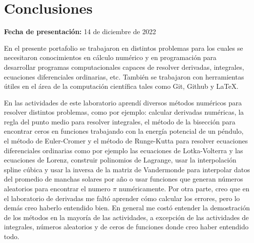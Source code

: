 \documentclass[../portafolio.tex]{subfiles}
\begin{document}
\chapter{Conclusiones}

\hfill \textbf{Fecha de presentación:} 14 de diciembre de 2022

\medskip



En el presente portafolio se trabajaron en distintos problemas para los cuales se necesitaron conocimientos en cálculo numérico y en programación para desarrollar programas computacionales capaces de resolver derivadas, integrales, ecuaciones diferenciales ordinarias, etc. También se trabajaron con herramientas útiles en el área de la computación científica tales como Git, Github y \LaTeX. 




\vspace{2mm}
En las actividades de este laboratorio aprendí diversos métodos numéricos para resolver distintos problemas, como por ejemplo: calcular derivadas numéricas, la regla del punto medio para resolver integrales, el método de la bisección para encontrar ceros en funciones trabajando con la energía potencial de un péndulo, el método de Euler-Cromer y el método de Runge-Kutta para resolver ecuaciones diferenciales ordinarias como por ejemplo las ecuaciones de Lotka-Volterra y las ecuaciones de Lorenz, construir polinomios de Lagrange, usar la interpolación spline cúbica y usar la inversa de la matriz de Vandermonde para interpolar datos del promedio de manchas solares por año o usar funciones que generan números aleatorios para encontrar el numero $\pi$ numéricamente. Por otra parte, creo que en el laboratorio de derivadas me faltó aprender cómo calcular los errores, pero lo demás creo haberlo entendido bien. En general me costó entender la demostración de los métodos en la mayoría de las actividades, a excepción de las actividades de integrales, números aleatorios y de ceros de funciones donde creo haber entendido todo.  
\end{document}
